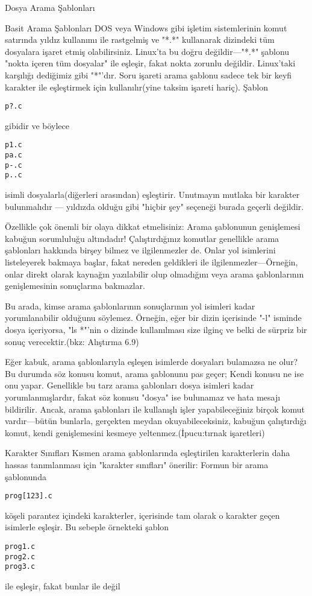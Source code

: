 \documentclass[10pt,a5paper]{book}
\begin{document}
\begin{section}{Dosya Arama Şablonları}
\begin{subsection}{Basit Arama Şablonları}
	DOS veya Windows gibi işletim sistemlerinin komut satırında yıldız kullanımı ile rastgelmiş ve "*.*" kullanarak dizindeki tüm dosyalara işaret etmiş olabilirsiniz. Linux'ta bu doğru değildir—"*.*" şablonu "nokta içeren tüm dosyalar" ile eşleşir, fakat nokta zorunlu değildir. Linux'taki karşılığı dediğimiz gibi "*"'dır.
Soru işareti arama şablonu sadece tek bir keyfi karakter ile eşleştirmek için kullanılır(yine taksim işareti hariç). Şablon
\begin{verbatim}
p?.c
\end{verbatim}
gibidir ve böylece
\begin{verbatim}
p1.c
pa.c
p-.c
p..c
\end{verbatim}
isimli dosyalarla(diğerleri arasından) eşleştirir. Unutmayın mutlaka bir karakter bulunmalıdır — yıldızda olduğu gibi "hiçbir şey" seçeneği burada geçerli değildir.

Özellikle çok önemli bir olaya dikkat etmelisiniz: Arama şablonunun genişlemesi kabuğun sorumluluğu altındadır! Çalıştırdığınız komutlar genellikle arama şablonları hakkında birşey bilmez ve ilgilenmezler de. Onlar yol isimlerini listeleyerek bakmaya başlar, fakat nereden geldikleri ile ilgilenmezler—Örneğin, onlar direkt olarak kaynağın yazılabilir olup olmadığını veya arama şablonlarının genişlemesinin sonuçlarına bakmazlar.

Bu arada, kimse arama şablonlarının sonuçlarının yol isimleri kadar yorumlanabilir olduğunu söylemez. Örneğin, eğer bir dizin içerisinde "-l" isminde dosya içeriyorsa,  "ls *"'nin o dizinde kullanılması size ilginç ve belki de sürpriz bir sonuç verecektir.(bkz: Alıştırma 6.9)

Eğer kabuk, arama şablonlarıyla eşleşen isimlerde dosyaları bulamazsa ne olur? Bu durumda söz konusu komut, arama şablonunu pas geçer; Kendi konusu ne ise onu yapar. Genellikle bu tarz arama şablonları dosya isimleri kadar yorumlanmışlardır, fakat söz konusu "dosya" ise bulunamaz ve hata mesajı bildirilir. Ancak, arama şablonları ile kullanışlı işler yapabileceğiniz birçok komut vardır—bütün bunlarla, gerçekten meydan okuyabileceksiniz, kabuğun çalıştırdığı komut, kendi genişlemesini kesmeye yeltenmez.(İpucu:tırnak işaretleri)
\end{subsection}
\begin{subsection}{Karakter Sınıfları}
Kısmen arama şablonlarında eşleştirilen karakterlerin daha hassas tanımlanması için "karakter sınıfları" önerilir: Formun bir arama şablonunda
\begin{verbatim}
prog[123].c
\end{verbatim}
köşeli parantez içindeki karakterler, içerisinde tam olarak o karakter geçen isimlerle eşleşir. Bu sebeple örnekteki şablon
\begin{verbatim}
prog1.c
prog2.c
prog3.c
\end{verbatim}
ile eşleşir, fakat bunlar ile değil


\end{subsection}
\end{section}
\end{document}
